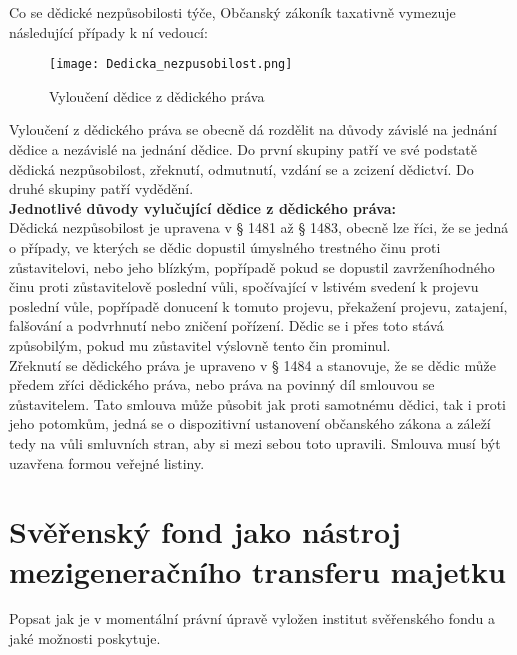 \documentclass{article}
\begin{document}
\newpage

Co se dědické nezpůsobilosti týče, Občanský zákoník taxativně vymezuje následující případy k ní vedoucí:

\begin{figure}[h]
\centering
\texttt{[image: Dedicka\_nezpusobilost.png]}
\caption[Vyloučení dědice z dědického práva]{Vyloučení dědice z dědického práva}
\label{fig:komparace}
\end{figure}

Vyloučení z dědického práva se obecně dá rozdělit na důvody závislé na jednání dědice a nezávislé na jednání dědice. Do první skupiny patří ve své podstatě dědická nezpůsobilost, zřeknutí, odmutnutí, vzdání se a zcizení dědictví. Do druhé skupiny patří vydědění. \\

\noindent\textbf{Jednotlivé důvody vylučující dědice z dědického práva:} \\

Dědická nezpůsobilost je upravena v § 1481 až § 1483, obecně lze říci, že se jedná o případy, ve kterých se dědic dopustil úmyslného trestného činu proti zůstavitelovi, nebo jeho blízkým, popřípadě pokud se dopustil zavrženíhodného činu proti zůstavitelově poslední vůli, spočívající v lstivém svedení k projevu poslední vůle, popřípadě donucení k tomuto projevu, překažení projevu, zatajení, falšování a podvrhnutí nebo zničení pořízení. Dědic se i přes toto stává způsobilým, pokud mu zůstavitel výslovně tento čin prominul. \\

Zřeknutí se dědického práva je upraveno v § 1484 a stanovuje, že se dědic může předem zříci dědického práva, nebo práva na povinný díl smlouvou se zůstavitelem. Tato smlouva může působit jak proti samotnému dědici, tak i proti jeho potomkům, jedná se o dispozitivní ustanovení občanského zákona a záleží tedy na vůli smluvních stran, aby si mezi sebou toto upravili. Smlouva musí být uzavřena formou veřejné listiny. \\

\newpage
\thispagestyle{smallertextinheader}

\section{Svěřenský fond jako nástroj mezigeneračního transferu majetku}

Popsat jak je v momentální právní úpravě vyložen institut svěřenského fondu a jaké možnosti poskytuje. \\
\end{document}
